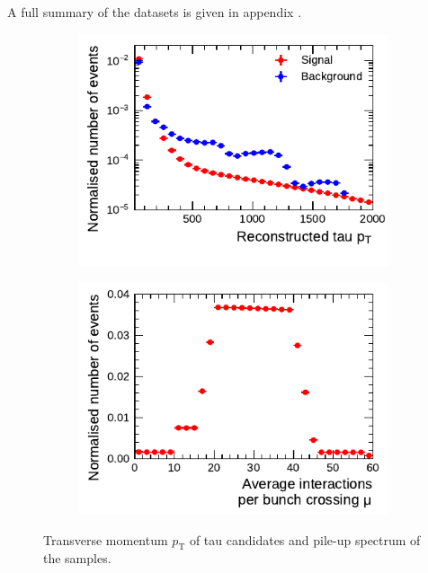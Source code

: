 A full summary of the datasets is given in appendix .

\begin{figure}[htb]
  \centering
  \begin{subfigure}[t]{0.48\textwidth}
    \centering
    \includegraphics{./figures/bdt_perf/pt_mu_samples/pt.pdf}
  \end{subfigure}\hfill
  \begin{subfigure}[t]{0.48\textwidth}
    \centering
    \includegraphics{./figures/bdt_perf/pt_mu_samples/mu.pdf}
  \end{subfigure}
  \caption{Transverse momentum $p_\text{T}$ of tau candidates and pile-up
    spectrum of the samples.}
  \label{fig:pt_mu}
\end{figure}

